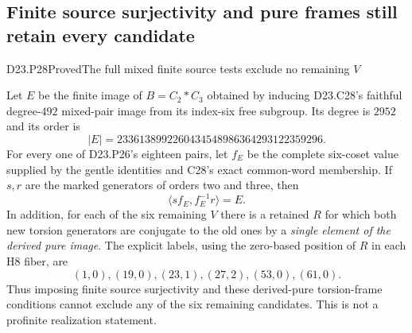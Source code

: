 \subsection{Finite source surjectivity and pure frames still retain every candidate}

\begin{statement}{D23.P28}{Proved}{The full mixed finite source tests exclude no remaining $V$}
\end{statement}
Let $E$ be the finite image of $B=C_2*C_3$ obtained by
inducing D23.C28's faithful degree-$492$ mixed-pair image
from its index-six free subgroup. Its degree is $2952$ and
its order is
\[
             |E|=2336138992260434548986364293122359296.
\]
For every one of D23.P26's eighteen pairs, let $f_E$ be
the complete six-coset value supplied by the gentle
identities and C28's exact common-word membership.
If $s,r$ are the marked generators of orders two and
three, then
\[
                       \langle sf_E,f_E^{-1}r\rangle=E.
                                                        \tag{D23.P28.1}
\]
In addition, for each of the six remaining $V$ there
is a retained $R$ for which both new torsion generators
are conjugate to the old ones by a \emph{single element
of the derived pure image}. The explicit labels, using the
zero-based position of $R$ in each H8 fiber, are
\[
                   (1,0),(19,0),(23,1),(27,2),(53,0),(61,0).
                                                        \tag{D23.P28.2}
\]
Thus imposing finite source surjectivity and these derived-pure
torsion-frame conditions cannot exclude any of the six
remaining candidates. This is not a profinite realization
statement.

